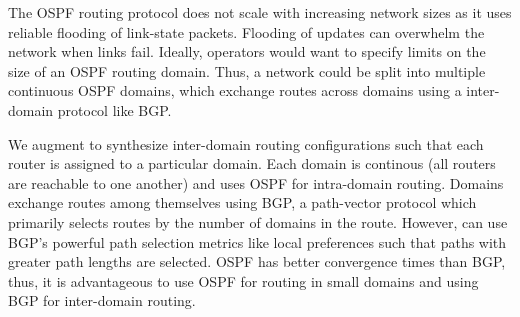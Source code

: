 \begin{figure}
	\centering
	\label{fig:ospfexample}
\end{figure}



The OSPF routing protocol does not scale 
with increasing network sizes
as it uses reliable
flooding of link-state packets. Flooding 
of updates can  
overwhelm the network when links fail. 
Ideally, operators would want to specify
limits on the size of an OSPF routing domain. 
Thus, a network could be 
split into multiple continuous OSPF domains,
which exchange routes across domains using
a inter-domain protocol like BGP.

We augment \name to synthesize 
inter-domain routing configurations 
such that each router is assigned to
a particular domain. 
Each domain is continous (all routers
are reachable to one another) and 
uses OSPF for intra-domain routing.
Domains exchange routes among  
themselves using BGP, a path-vector 
protocol which primarily selects routes by 
the number of domains in the route. 
However, \name can 
use BGP's powerful path selection metrics 
like local preferences such that  
paths with greater path lengths are selected.
OSPF has better convergence times than BGP,
thus, it is advantageous to use OSPF for 
routing in small domains and using BGP for
inter-domain routing. 

